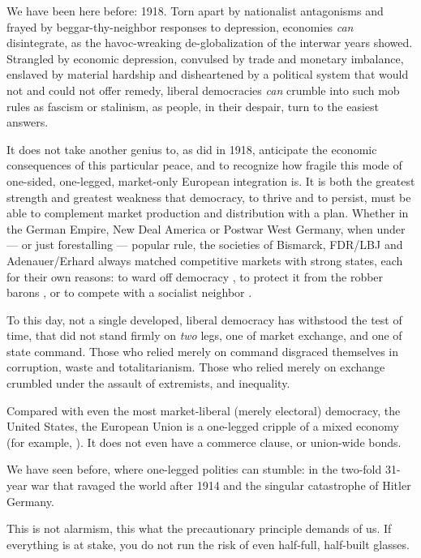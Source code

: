 We have been here before: 1918. Torn apart by nationalist antagonisms and frayed by beggar-thy-neighbor responses to depression, economies \emph{can} disintegrate, as the havoc-wreaking de-globalization of the interwar years showed. Strangled by economic depression, convulsed by trade and monetary imbalance, enslaved by material hardship and disheartened by a political system that would not and could not offer remedy, liberal democracies \emph{can} crumble into such mob rules as fascism or stalinism, as people, in their despair, turn to the easiest answers.

It does not take another genius to, as \cite{Keynes1936} did in 1918, anticipate the economic consequences of this particular peace, and to recognize how fragile this mode of one-sided, one-legged, market-only European integration is. It is both the greatest strength and greatest weakness that democracy, to thrive and to persist, must be able to complement market production and distribution with a plan. Whether in the German Empire, New Deal America or  Postwar West Germany, when under --- or just forestalling --- popular rule, the societies of Bismarck, FDR/LBJ and Adenauer/Erhard always matched competitive markets with strong states, each for their own reasons: to ward off democracy \citep{Leibfried}, to protect it from the robber barons \citep{Wapshott2011}, or to compete with a socialist neighbor \citep{Judt2006}.

To this day, not a single developed, liberal democracy has withstood the test of time, that did not stand firmly on \emph{two} legs, one of market exchange, and one of state command. Those who relied merely on command disgraced themselves in corruption, waste and totalitarianism. Those who relied merely on exchange crumbled under the assault of extremists, and inequality. 

Compared with even the most market-liberal (merely electoral) democracy, the United States, the European Union is a one-legged cripple of a mixed economy (for example, \citealt{Bordo2011}). It does not even have a commerce clause, or union-wide bonds.

We have seen before, where one-legged polities can stumble: in the two-fold 31-year war that ravaged the world after 1914 and the singular catastrophe of Hitler Germany.

This is not alarmism, this what the precautionary principle demands of us. If everything is at stake, you do not run the risk of even half-full, half-built glasses.

